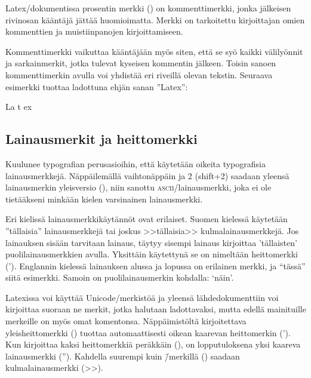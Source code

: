 Latex\-/dokumentissa prosentin merkki (\koodi{\%}) on kommenttimerkki,
jonka jälkeisen rivin\-osan kääntäjä jättää huomioimatta. Merkki on
tarkoitettu kirjoittajan omien kommenttien ja muistiinpanojen
kirjoittamiseen.

\begin{koodilohkosis}
\end{koodilohkosis}

Kommenttimerkki vaikuttaa kääntäjään myös siten, että se syö kaikki
välilyönnit ja sarkainmerkit, jotka tulevat kyseisen kommentin jälkeen.
Toisin sanoen kommenttimerkin avulla voi yhdistää eri riveillä olevan
tekstin. Seuraava esimerkki tuottaa ladottuna ehjän sanan ''Latex'':

\begin{koodilohkosis}
  La%
    t%
      ex
\end{koodilohkosis}

\subsection{Lainausmerkit ja heittomerkki}

Kuulunee typo\-grafian perus\-asioihin, että käytetään oikeita
typo\-grafisia lainausmerkkejä. Näppäilemällä vaihtonäppäin ja 2
(shift+2) saadaan yleensä lainausmerkin yleisversio (\textquotedbl),
niin sanottu \textsc{ascii}\-/lainausmerkki, joka ei ole tietääkseni
minkään kielen varsinainen lainausmerkki.

Eri kielissä lainausmerkkikäytännöt ovat erilaiset. Suomen kielessä
käytetään ''tällaisia'' lainausmerkkejä tai joskus >>tällaisia>>
kulmalainausmerkkejä. Jos lainauksen sisään tarvitaan lainaus, täytyy
sisempi lainaus kirjoittaa 'tällaisten' puolilainausmerkkien avulla.
Yksittäin käytettynä se on nimeltään heittomerkki ('). Englannin
kielessä lainauksen alussa ja lopussa on erilainen merkki, ja ``tässä''
siitä esimerkki. Samoin on puolilainausmerkin kohdalla: `näin'.

Latexissa voi käyttää Unicode\-/merkistöä ja yleensä lähdedokumenttiin
voi kirjoittaa suoraan ne merkit, jotka halutaan ladottavaksi, mutta
edellä mainituille merkeille on myös omat komentonsa. Näppäimistöltä
kirjoitettava yleisheittomerkki () tuottaa automaattisesti
oikean kaarevan heittomerkin ('). Kun kirjoittaa kaksi heittomerkkiä
peräkkäin (), on lopputuloksena yksi kaareva lainausmerkki
(''). Kahdella suurempi kuin \=/merkillä (\koodi{>>}) saadaan
kulmalainausmerkki (>>).

